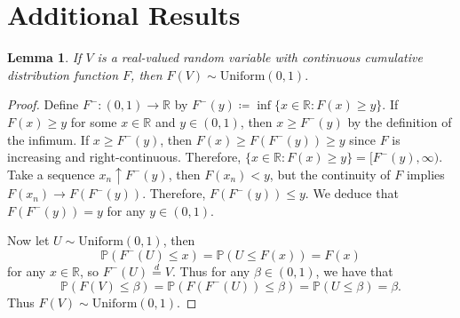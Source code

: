 \documentclass[11pt, titlepage]{article} %
\newcommand{\R}{\mathrm}
\newcommand{\Prob}[1]{\mathbb{P}\left( #1 \right)}
\numberwithin{equation}{section}
\newtheorem{lemma}{Lemma}
\theoremstyle{definition}
\numberwithin{theorem}{section}
\numberwithin{lemma}{section}
\numberwithin{corollary}{section}
\numberwithin{proposition}{section}
\numberwithin{definition}{section}
\numberwithin{remark}{section}
\begin{document}

\nocite{*}
\printbibliography


\appendix

\section{Additional Results}
\label{appendix:results}

\begin{lemma}
If \(V\) is a real-valued random variable with continuous cumulative distribution function \(F\), then \(F(V) \sim \R{Uniform}(0,1).\)
\end{lemma}
\begin{proof}
    Define \(F^{-}:(0,1) \to \mathbb{R}\) by \(F^{-}(y) \coloneqq \inf\{ x\in \mathbb{R}: F(x) \geq y\}.\) If \(F(x) \geq y\) for some \(x \in \mathbb{R}\) and \(y \in (0,1)\), then \(x \geq F^{-}(y)\) by the definition of the infimum. If \(x \geq F^{-}(y)\), then \(F(x) \geq F(F^{-}(y)) \geq y\) since \(F\) is increasing and right-continuous. Therefore, \(\{x \in \mathbb{R}: F(x) \geq y\} = [F^{-}(y), \infty).\) Take a sequence \(x_n \uparrow F^{-}(y)\), then \(F(x_n) < y\), but the continuity of \(F\) implies \(F(x_n) \to F(F^{-}(y))\). Therefore, \(F(F^{-}(y)) \leq y\). We deduce that \(F(F^{-}(y)) = y\) for any \(y \in (0,1)\). \vskip5pt

    \noindent
    Now let \(U \sim \R{Uniform}(0,1)\), then \[\Prob{F^{-}(U) \leq x} = \Prob{U \leq F(x)} = F(x)\] for any \(x \in \mathbb{R}\), so \(F^{-}(U) \overset{d}{=} V\). Thus for any \(\beta \in (0,1)\), we have that \[\Prob{F(V) \leq \beta} = \Prob{F(F^{-}(U)) \leq \beta} = \Prob{U \leq \beta} = \beta.\] Thus \(F(V) \sim \R{Uniform}(0,1).\)
\end{proof}
\end{document}
